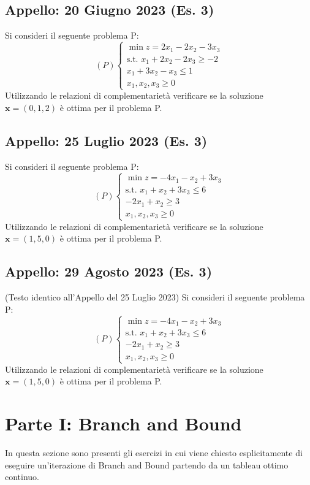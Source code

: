 \documentclass[11pt, a4paper]{article}
\begin{document}
\subsection{Appello: 20 Giugno 2023 (Es. 3)}
Si consideri il seguente problema P:
\[ (P) \begin{cases} \min z = 2x_1 - 2x_2 - 3x_3 \\ \text{s.t. } x_1 + 2x_2 - 2x_3 \ge -2 \\ x_1 + 3x_2 - x_3 \le 1 \\ x_1, x_2, x_3 \ge 0 \end{cases} \]
Utilizzando le relazioni di complementarietà verificare se la soluzione $\mathbf{x} = (0,1,2)$ è ottima per il problema P.

\subsection{Appello: 25 Luglio 2023 (Es. 3)}
Si consideri il seguente problema P:
\[ (P) \begin{cases} \min z = -4x_1 - x_2 + 3x_3 \\ \text{s.t. } x_1 + x_2 + 3x_3 \le 6 \\ -2x_1 + x_2 \ge 3 \\ x_1, x_2, x_3 \ge 0 \end{cases} \]
Utilizzando le relazioni di complementarietà verificare se la soluzione $\mathbf{x} = (1,5,0)$ è ottima per il problema P.

\subsection{Appello: 29 Agosto 2023 (Es. 3)}
(Testo identico all'Appello del 25 Luglio 2023)
Si consideri il seguente problema P:
\[ (P) \begin{cases} \min z = -4x_1 - x_2 + 3x_3 \\ \text{s.t. } x_1 + x_2 + 3x_3 \le 6 \\ -2x_1 + x_2 \ge 3 \\ x_1, x_2, x_3 \ge 0 \end{cases} \]
Utilizzando le relazioni di complementarietà verificare se la soluzione $\mathbf{x} = (1,5,0)$ è ottima per il problema P.


\section{Parte I: Branch and Bound}
In questa sezione sono presenti gli esercizi in cui viene chiesto esplicitamente di eseguire un'iterazione di Branch and Bound partendo da un tableau ottimo continuo.
\end{document}
